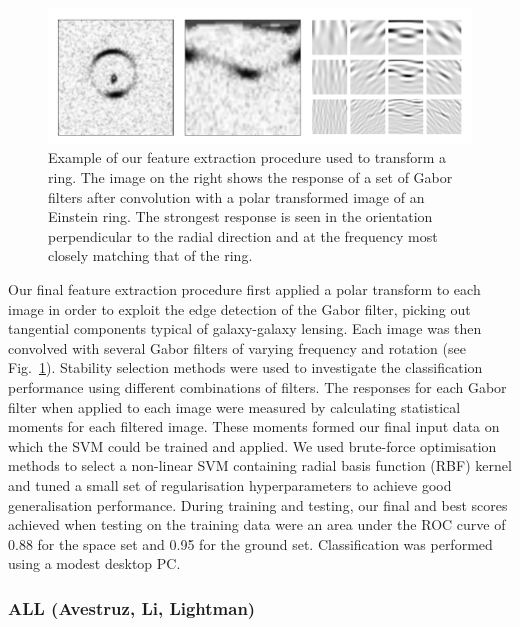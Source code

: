 \documentclass{aa}
\begin{document}
\begin{figure}
  \centering
      \includegraphics[width=1\columnwidth]{figures/polarfilter.pdf} 
  \caption{Example of our feature extraction procedure used to transform a ring. The image on the right shows the response of a set of Gabor filters after convolution with a polar transformed image of an Einstein ring. The strongest response is seen in the orientation perpendicular to the radial direction and at the frequency most closely matching that of the ring.}
 \label{gaborring}
\end{figure}

Our final feature extraction procedure first applied a polar transform to each image in order to exploit the edge detection of the Gabor filter, picking out tangential components typical of galaxy-galaxy lensing. Each image was then convolved with several Gabor filters of varying frequency and rotation (see Fig.~\ref{gaborring}). Stability selection methods were used to investigate the classification performance using different combinations of filters. The responses for each Gabor filter when applied to each image were measured by calculating statistical moments for each filtered image. These moments formed  our final input data on which the SVM could be trained and applied. We used brute-force optimisation methods to select a non-linear SVM containing radial basis function (RBF) kernel and tuned a small set of regularisation hyperparameters to achieve good generalisation performance. During training and testing, our final and best scores achieved when testing on the  training data were an area under the ROC curve of 0.88 for the space set and 0.95 for the ground set. Classification was performed using a modest desktop PC.

\subsubsection{ALL (Avestruz, Li, Lightman)}
\label{sec:ALL}
\end{document}
